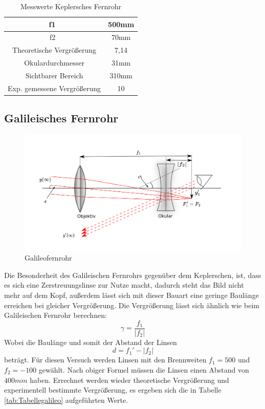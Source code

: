 \begin{table}[h]
    \centering
    \begin{tabular}{|c|c|}
	\hline
	f1\ & 500mm \\
	\hline
	f2\ & 70mm \\
	\hline
	Theoretische Vergrößerung  & 7,14 \\
	\hline
	Okulardurchmesser & 31mm \\
	\hline
	Sichtbarer Bereich & 310mm \\
	\hline
	Exp. gemessene Vergrößerung & 10 \\
	\hline
    \end{tabular}
    \caption{Messwerte Keplersches Fernrohr}
    \label{tab:Tabellekeppler}
\end{table}

\subsection{Galileisches Fernrohr}

\begin{figure}[h!]
    \centering
    \includegraphics[scale=0.8]{Geometrische_Optik/Protokoll/fig/Galileofernrohr.png}
    \caption{Galileofernrohr}
    \label{fig:Galileofernrohr}
\end{figure}

Die Besonderheit des Galileischen Fernrohrs gegenüber dem Keplerschen, ist, dass es sich eine Zerstreuungslinse zur Nutze macht, dadurch steht das Bild nicht mehr auf dem Kopf, außerdem lässt sich mit dieser Bauart eine geringe Baulänge erreichen bei gleicher Vergrößerung. Die Vergrößerung lässt sich ähnlich wie beim Galileischen Fernrohr berechnen: $$ \gamma = \frac{f_1}{|f_2|} $$ Wobei die Baulänge und somit der Abstand der Linsen $$ d = f_1' - |f_2| $$ beträgt. Für diesen Versuch werden Linsen mit den Brennweiten $f_1 = 500$ und $f_2 = -100$ gewählt. Nach obiger Formel müssen die Linsen einen Abstand von $400mm$ haben. Errechnet werden wieder theoretische Vergrößerung und experimentell bestimmte Vergrößerung, es ergeben sich die in Tabelle \ref{tab:Tabellegalileo} aufgeführten Werte.

